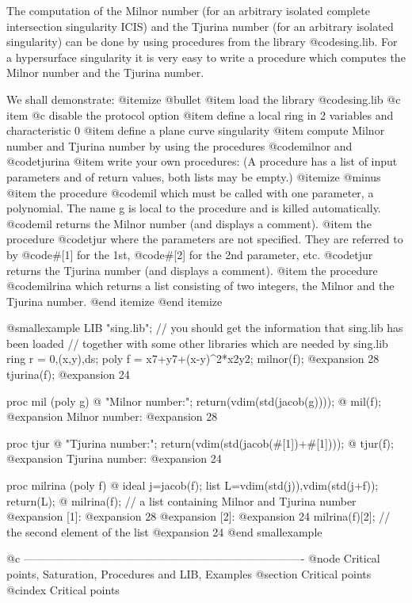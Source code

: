 The computation of the Milnor number (for an arbitrary isolated complete
intersection singularity ICIS) and the Tjurina number (for an arbitrary
isolated singularity) can be done by using procedures from the library
@code{sing.lib}. For a hypersurface singularity it is very easy to write a
procedure which computes the Milnor number and the Tjurina number.

We shall demonstrate:
@itemize @bullet
@item
load the library @code{sing.lib}
@c item
@c disable the protocol option
@item
define a local ring in 2 variables and characteristic 0
@item
define a plane curve singularity
@item
compute Milnor number and Tjurina number by using the procedures
@code{milnor} and @code{tjurina}
@item
write your own procedures:
(A procedure has a list of input parameters and of return values, both
lists may be empty.)
  @itemize @minus
  @item
  the procedure @code{mil} which must be called with one parameter, a
  polynomial.
  The name g is local to the procedure and is killed automatically.
  @code{mil} returns the Milnor number (and displays a comment).
  @item
  the procedure @code{tjur} where the parameters are not specified. They
  are referred
  to by @code{#[1]} for the 1st, @code{#[2]} for the 2nd parameter, etc.
  @code{tjur} returns the Tjurina number (and displays a comment).
  @item
  the procedure @code{milrina} which returns a list consisting of two
  integers,
  the Milnor and the Tjurina number.
  @end itemize
@end itemize

@smallexample
LIB "sing.lib";
// you should get the information that sing.lib has been loaded
// together with some other libraries which are needed by sing.lib
ring r = 0,(x,y),ds;
poly f = x7+y7+(x-y)^2*x2y2;
milnor(f);
@expansion{} 28
tjurina(f);
@expansion{} 24

proc mil (poly g)
@{
   "Milnor number:";
   return(vdim(std(jacob(g))));
@}
mil(f);
@expansion{} Milnor number:
@expansion{} 28

proc tjur
@{
   "Tjurina number:";
   return(vdim(std(jacob(#[1])+#[1])));
@}
tjur(f);
@expansion{} Tjurina number:
@expansion{} 24

proc milrina (poly f)
@{
   ideal j=jacob(f);
   list L=vdim(std(j)),vdim(std(j+f));
   return(L);
@}
milrina(f);     // a list containing Milnor and Tjurina number
@expansion{} [1]:
@expansion{}    28
@expansion{} [2]:
@expansion{}    24
milrina(f)[2];  // the second element of the list
@expansion{} 24
@end smallexample

@c ----------------------------------------------------------------------------
@node Critical points, Saturation, Procedures and LIB, Examples
@section Critical points
@cindex Critical points

